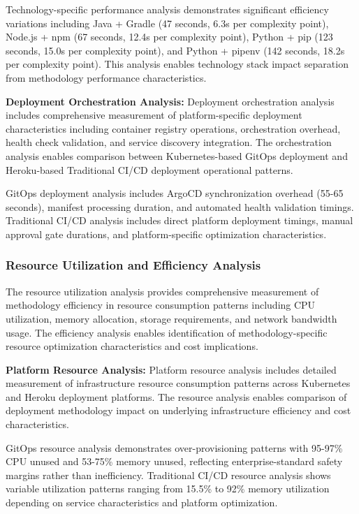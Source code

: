 Technology-specific performance analysis demonstrates significant efficiency variations including Java + Gradle (47 seconds, 6.3s per complexity point), Node.js + npm (67 seconds, 12.4s per complexity point), Python + pip (123 seconds, 15.0s per complexity point), and Python + pipenv (142 seconds, 18.2s per complexity point). This analysis enables technology stack impact separation from methodology performance characteristics.

\textbf{Deployment Orchestration Analysis:}
Deployment orchestration analysis includes comprehensive measurement of platform-specific deployment characteristics including container registry operations, orchestration overhead, health check validation, and service discovery integration. The orchestration analysis enables comparison between Kubernetes-based GitOps deployment and Heroku-based Traditional CI/CD deployment operational patterns.

GitOps deployment analysis includes ArgoCD synchronization overhead (55-65 seconds), manifest processing duration, and automated health validation timings. Traditional CI/CD analysis includes direct platform deployment timings, manual approval gate durations, and platform-specific optimization characteristics.

\subsubsection{Resource Utilization and Efficiency Analysis}

The resource utilization analysis provides comprehensive measurement of methodology efficiency in resource consumption patterns including CPU utilization, memory allocation, storage requirements, and network bandwidth usage. The efficiency analysis enables identification of methodology-specific resource optimization characteristics and cost implications.

\textbf{Platform Resource Analysis:}
Platform resource analysis includes detailed measurement of infrastructure resource consumption patterns across Kubernetes and Heroku deployment platforms. The resource analysis enables comparison of deployment methodology impact on underlying infrastructure efficiency and cost characteristics.

GitOps resource analysis demonstrates over-provisioning patterns with 95-97\% CPU unused and 53-75\% memory unused, reflecting enterprise-standard safety margins rather than inefficiency. Traditional CI/CD resource analysis shows variable utilization patterns ranging from 15.5\% to 92\% memory utilization depending on service characteristics and platform optimization.

